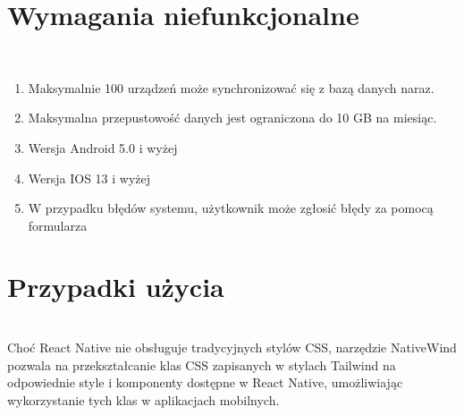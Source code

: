 \section{Wymagania niefunkcjonalne}\\

\begin{enumerate}
  \item Maksymalnie 100 urządzeń może synchronizować się z bazą danych naraz.
  \item Maksymalna przepustowość danych jest ograniczona do 10 GB na miesiąc.
  \item Wersja Android 5.0 i wyżej
  \item Wersja IOS 13 i wyżej
  \item W przypadku błędów systemu, użytkownik może zgłosić błędy za pomocą formularza
\end{enumerate}


  
\section{Przypadki użycia}\\
Choć React Native nie obsługuje tradycyjnych stylów CSS, narzędzie NativeWind pozwala na przekształcanie klas CSS zapisanych w stylach Tailwind na odpowiednie style i komponenty dostępne w React Native, umożliwiając wykorzystanie tych klas w aplikacjach mobilnych.\\
